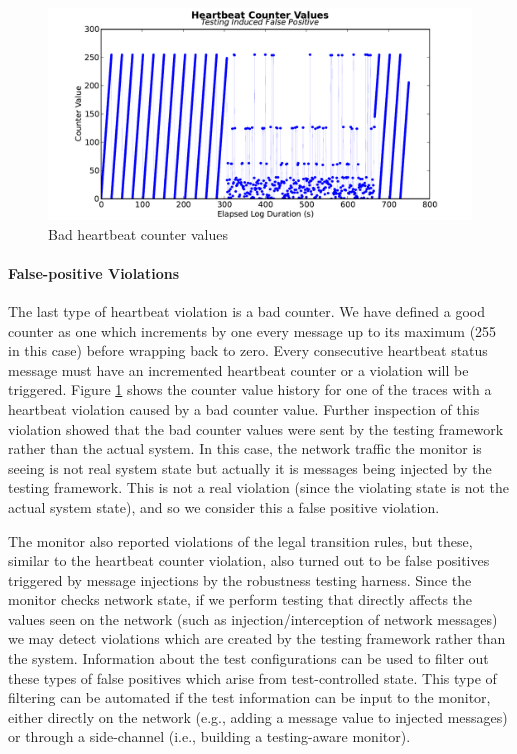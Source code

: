 \begin{figure}
\includegraphics[width=4.5in]{img/hb2}
\caption{Bad heartbeat counter values \label{fig:hb_badcounter}}
\end{figure}

\paragraph{False-positive Violations}
The last type of heartbeat violation is a bad counter. 
We have defined a good counter as one which increments by one every message up to its maximum (255 in this case) before wrapping back to zero.
Every consecutive heartbeat status message must have an incremented heartbeat counter or a violation will be triggered. Figure \ref{fig:hb_badcounter} shows the counter value history for one of the traces with a heartbeat violation caused by a bad counter value.
%
Further inspection of this violation showed that the bad counter values were sent by the testing framework rather than the actual system. In this case, the network traffic the monitor is seeing is not real system state but actually it is messages being injected by the testing framework. This is not a real violation (since the violating state is not the actual system state), and so we consider this a false positive violation.



The monitor also reported violations of the legal transition rules, but these, similar to the heartbeat counter violation, also turned out to be false positives triggered by message injections by the robustness testing harness. Since the monitor checks network state, if we perform testing that directly affects the values seen on the network (such as injection/interception of network messages) we may detect violations which are created by the testing framework rather than the system. 
Information about the test configurations can be used to filter out these types of false positives which arise from test-controlled state.
This type of filtering can be automated if the test information can be input to the monitor, either directly on the network (e.g., adding a message value to injected messages) or through a side-channel (i.e., building a testing-aware monitor).
